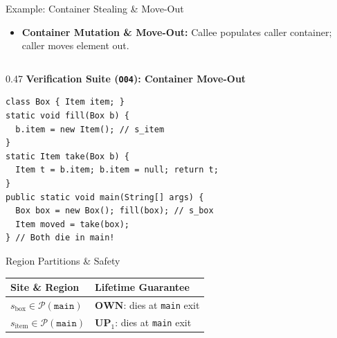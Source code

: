 \documentclass[11pt]{beamer}
\begin{document}
\begingroup
{}
\begin{frame}[fragile]{Example: Container Stealing \& Move-Out}
  \begin{itemize}
    \small
    \item \textbf{Container Mutation \& Move-Out:} Callee populates caller container; caller moves element out.
  \end{itemize}
  \vspace{-0.85em}

  \begin{columns}[T,onlytextwidth]
    \begin{column}{0.47\textwidth}
      {\fontsize{7.0pt}{8.2pt}\selectfont\bfseries\color{darkblue} Verification Suite (\texttt{O04}): Container Move-Out}\\[1pt]
\begin{lstlisting}[style=javacodetiny]
class Box { Item item; }
static void fill(Box b) {
  b.item = new Item(); // s_item
}
static Item take(Box b) {
  Item t = b.item; b.item = null; return t;
}
public static void main(String[] args) {
  Box box = new Box(); fill(box); // s_box
  Item moved = take(box);
} // Both die in main!
\end{lstlisting}
      \vspace{-0.8em}

      \begin{block}{Region Partitions \& Safety}
        \scriptsize
        \begin{tabular}{@{}ll@{}}
          \toprule
          \textbf{Site \& Region} & \textbf{Lifetime Guarantee} \\
          \midrule
          $s_{\text{box}} \in \mathcal{P}(\texttt{main})$ & $\mathbf{OWN}$: dies at \texttt{main} exit \\
          $s_{\text{item}} \in \mathcal{P}(\texttt{main})$ & $\mathbf{UP}_1$: dies at \texttt{main} exit \\
          \bottomrule
        \end{tabular}
      \end{block}
    \end{column}


\end{columns}
\end{frame}
\end{document}
